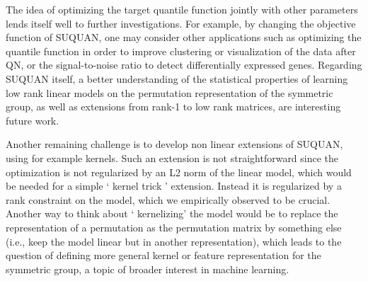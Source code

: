 \documentclass{article}
\begin{document}
The idea of optimizing the target quantile function jointly with other parameters lends itself well to further investigations. For example, by changing the objective function of SUQUAN, one may consider other applications such as optimizing the quantile function in order to improve clustering or visualization of the data after QN, or the signal-to-noise ratio to detect differentially expressed genes. Regarding SUQUAN itself, a better understanding of the statistical properties of learning low rank linear models on the permutation representation of the symmetric group, as well as extensions from rank-1 to low rank matrices, are interesting future work.

Another remaining challenge is to develop non linear extensions of SUQUAN, using for example kernels. Such an extension is not straightforward since the optimization is not regularized by an L2 norm of the linear model, which would be needed for a simple ` kernel trick ' extension. Instead it is regularized by a rank constraint on the model, which we empirically observed to be crucial. Another way to think about ` kernelizing' the model would be to replace the representation of a permutation as the permutation matrix by something else (i.e., keep the model linear but in another representation), which leads to the question of defining more general kernel or feature representation for the symmetric group, a topic of broader interest in machine learning.



\end{document}
